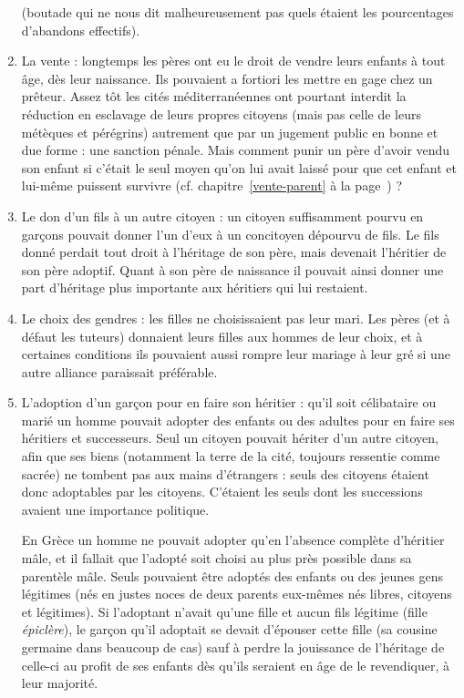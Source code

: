 \begin{enumerate}
{{}} (boutade qui ne nous dit malheureusement pas
quels étaient les pourcentages d'abandons effectifs).
\item La vente : longtemps les pères ont eu le droit de vendre leurs
enfants à tout âge, dès leur naissance. Ils pouvaient a fortiori les mettre
en gage chez un prêteur. Assez tôt les cités méditerranéennes ont pourtant
interdit la réduction en esclavage de leurs propres citoyens (mais pas
celle de leurs métèques et pérégrins) autrement que par un jugement public
en bonne et due forme : une sanction pénale. Mais comment punir
un père d'avoir vendu son enfant si c'était le seul moyen qu'on lui avait
laissé pour que cet enfant et lui-même puissent survivre (cf. chapitre~\ref{vente-parent} à la page~\pageref{vente-parent}) ?
\item Le don d'un fils à un autre citoyen : un citoyen suffisamment
pourvu en garçons pouvait donner l'un d'eux à un concitoyen dépourvu
de fils. Le fils donné perdait tout droit à l'héritage de son père, mais devenait
l'héritier de son père adoptif. Quant à son père de naissance il
pouvait ainsi donner une part d'héritage plus importante aux héritiers qui
lui restaient.
\item Le choix des gendres : les filles ne choisissaient pas leur mari.
Les pères (et à défaut les tuteurs) donnaient leurs filles aux hommes de
leur choix, et à certaines conditions ils pouvaient aussi rompre leur mariage
à leur gré si une autre alliance paraissait préférable.
\item L'adoption d'un garçon pour en faire son héritier : qu'il soit célibataire
ou marié un homme pouvait adopter des enfants ou des adultes
pour en faire ses héritiers et successeurs. Seul un citoyen pouvait hériter
d'un autre citoyen, afin que ses biens (notamment la terre de la cité, toujours
ressentie comme sacrée) ne tombent pas aux mains d'étrangers :
seuls des citoyens étaient donc adoptables par les citoyens. C'étaient les
seuls dont les successions avaient une importance politique.

En Grèce un homme ne pouvait adopter qu'en l'absence complète
d'héritier mâle, et il fallait que l'adopté soit choisi au plus près possible
dans sa parentèle mâle. Seuls pouvaient être adoptés des enfants ou des
jeunes gens légitimes (nés en justes noces de deux parents eux-mêmes
nés libres, citoyens et légitimes). Si l'adoptant n'avait qu'une fille et aucun
fils légitime (fille \emph{épiclère}), le garçon qu'il adoptait se devait d'épouser cette
fille (sa cousine germaine dans beaucoup de cas) sauf à perdre la jouissance
de l'héritage de celle-ci au profit de ses enfants dès qu'ils seraient
en âge de le revendiquer, à leur majorité.


\end{enumerate}
